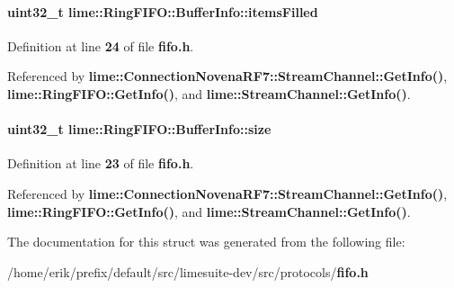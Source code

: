 \paragraph[{items\+Filled}]{\setlength{\rightskip}{0pt plus 5cm}uint32\+\_\+t lime\+::\+Ring\+F\+I\+F\+O\+::\+Buffer\+Info\+::items\+Filled}\label{structlime_1_1RingFIFO_1_1BufferInfo_ab378fe38fb4543d39d4def8b0f9a603f}


Definition at line {\bf 24} of file {\bf fifo.\+h}.



Referenced by {\bf lime\+::\+Connection\+Novena\+R\+F7\+::\+Stream\+Channel\+::\+Get\+Info()}, {\bf lime\+::\+Ring\+F\+I\+F\+O\+::\+Get\+Info()}, and {\bf lime\+::\+Stream\+Channel\+::\+Get\+Info()}.

\paragraph[{size}]{\setlength{\rightskip}{0pt plus 5cm}uint32\+\_\+t lime\+::\+Ring\+F\+I\+F\+O\+::\+Buffer\+Info\+::size}\label{structlime_1_1RingFIFO_1_1BufferInfo_a412d7b2c97bdc4dab3b5ec34ee68c93b}


Definition at line {\bf 23} of file {\bf fifo.\+h}.



Referenced by {\bf lime\+::\+Connection\+Novena\+R\+F7\+::\+Stream\+Channel\+::\+Get\+Info()}, {\bf lime\+::\+Ring\+F\+I\+F\+O\+::\+Get\+Info()}, and {\bf lime\+::\+Stream\+Channel\+::\+Get\+Info()}.



The documentation for this struct was generated from the following file\+:\begin{DoxyCompactItemize}
\item 
/home/erik/prefix/default/src/limesuite-\/dev/src/protocols/{\bf fifo.\+h}\end{DoxyCompactItemize}

